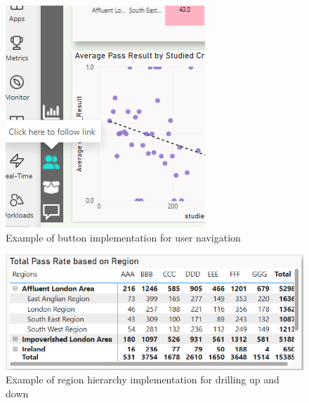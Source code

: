 \begin{figure}[h]
    \centering
    \includegraphics[width=\linewidth]{photo/buttonim.png}
    \caption{Example of button implementation for user navigation}
    \label{buttonim}
\end{figure}

\begin{figure}[h]
    \centering
    \includegraphics[width=\linewidth]{photo/hierarchy.PNG}
    \caption{Example of region hierarchy implementation for drilling up and down}
    \label{hierar}
\end{figure}

